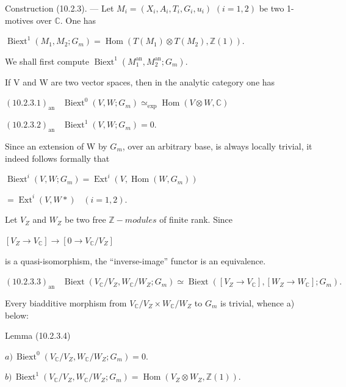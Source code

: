 \documentclass[11pt,twoside]{article}
\newcommand{\DFormula}[1]{%
  \par\smallskip\noindent\hspace*{0pt}\(\displaystyle #1\)\par\smallskip
}
\begin{document}
Construction (10.2.3). — Let \(M_{i}=(X_{i},A_{i},T_{i},G_{i},u_{i})\) \((i=1,2)\) be two 1-motives over \(\mathbb{C}\). One has\par
\par\medskip
\DFormula{\operatorname{Biext}^{1}(M_{1},M_{2};G_{m})=\operatorname{Hom}(T(M_{1})\otimes T(M_{2}),\mathbb{Z}(1)).}
\par\medskip
We shall first compute \(\operatorname{Biext}^{1}(M_{1}^{\mathrm{an}},M_{2}^{\mathrm{an}};G_{m})\).\par
If V and W are two vector spaces, then in the analytic category one has\par
\par\medskip
\DFormula{(10.2.3.1)_{\mathrm{an}}\,\,\,\,\,\operatorname{Biext}^{0}(V,W;G_{m})\simeq _{\operatorname{exp}}\operatorname{Hom}(V\otimes W,\mathbb{C})}
\DFormula{(10.2.3.2)_{\mathrm{an}}\,\,\,\,\,\operatorname{Biext}^{1}(V,W;G_{m})=0.}
\par\medskip
Since an extension of W by \(G_{m}\), over an arbitrary base, is always locally trivial, it indeed follows formally that\par
\par\medskip
\DFormula{\operatorname{Biext}^{i}(V,W;G_{m})=\operatorname{Ext}^{i}(V,\operatorname{Hom}(W,G_{m}))}
\DFormula{=\operatorname{Ext}^{i}(V,W\ast )\,\,\,\,\,(i=1,2).}
\par\medskip
Let \(V_{Z}\) and \(W_{Z}\) be two free \(\mathbb{Z}-modules\) of finite rank. Since\par
\par\medskip
\DFormula{[V_{Z}\to V_{\mathbb{C}}]\to [0\to V_{\mathbb{C}}/V_{Z}]}
\par\medskip
is a quasi-isomorphism, the “inverse-image” functor is an equivalence.\par
\par\medskip
\DFormula{(10.2.3.3)_{\mathrm{an}}\,\,\,\,\,\operatorname{Biext}(V_{\mathbb{C}}/V_{Z},W_{\mathbb{C}}/W_{Z};G_{m})\simeq \operatorname{Biext}([V_{Z}\to V_{\mathbb{C}}],[W_{Z}\to W_{\mathbb{C}}];G_{m}).}
\par\medskip
Every biadditive morphism from \(V_{\mathbb{C}}/V_{Z}\times W_{\mathbb{C}}/W_{Z}\) to \(G_{m}\) is trivial, whence a) below:\par
\par\medskip
Lemma (10.2.3.4)\par
\par\medskip
\DFormula{a)\,\operatorname{Biext}^{0}(V_{\mathbb{C}}/V_{Z},W_{\mathbb{C}}/W_{Z};G_{m})=0.}
\DFormula{b)\,\operatorname{Biext}^{1}(V_{\mathbb{C}}/V_{Z},W_{\mathbb{C}}/W_{Z};G_{m})=\operatorname{Hom}(V_{Z}\otimes W_{Z},\mathbb{Z}(1)).}
\end{document}
